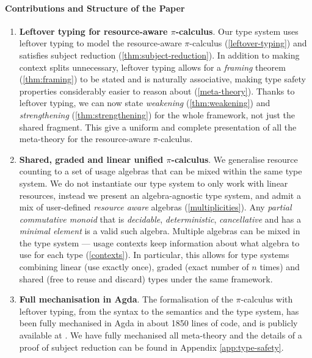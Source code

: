 \documentclass[runningheads]{llncs}
\newcommand{\picalc}{$\pi$-calculus}
\begin{document}
\paragraph*{Contributions and Structure of the Paper}
\begin{enumerate}
  \item \textbf{Leftover typing for resource-aware \picalc{}}. Our type system uses leftover typing to model the resource-aware \picalc{} (\autoref{leftover-typing}) and satisfies subject reduction (\autoref{thm:subject-reduction}).
    In addition to making context splits unnecessary, leftover typing allows for a \emph{framing} theorem (\autoref{thm:framing}) to be stated and is naturally associative, making type safety properties considerably easier to reason about (\autoref{meta-theory}).
    Thanks to leftover typing, we can now state \emph{weakening} (\autoref{thm:weakening}) and \emph{strengthening} (\autoref{thm:strengthening}) for the whole framework, not just the shared fragment. This give a uniform and complete presentation of all the meta-theory for the resource-aware \picalc{}.    
  \item \textbf{Shared, graded and linear unified \picalc{}}.
  We {generalise resource counting to a set of usage algebras that can be mixed within the same type system}.
    We do not instantiate our type system to only work with linear resources, instead we present an algebra-agnostic type system, and admit a mix of user-defined \emph{resource aware} algebras (\autoref{multiplicities}).
    Any \emph{partial commutative monoid} that is \emph{decidable}, \emph{deterministic}, \emph{cancellative} and has a \emph{minimal element} is a valid such algebra.
    Multiple algebras can be mixed in the type system --- usage contexts keep information about what algebra to use for each type (\autoref{contexts}).
    In particular, this allows for type systems combining linear (use exactly once), graded (exact number of $n$ times) and shared (free to reuse and discard) types under the same framework.
    
    \item \textbf{Full mechanisation in Agda}. The formalisation of the \picalc{} with leftover typing, from the syntax to the semantics and the type system, has been fully mechanised in Agda in about 1850 lines of code, and is publicly available at \cite{Zalakain2020Agda}.  We have fully mechanised all meta-theory and the details of a proof of subject reduction can be found in Appendix \ref{app:type-safety}.
\end{enumerate}
\end{document}

